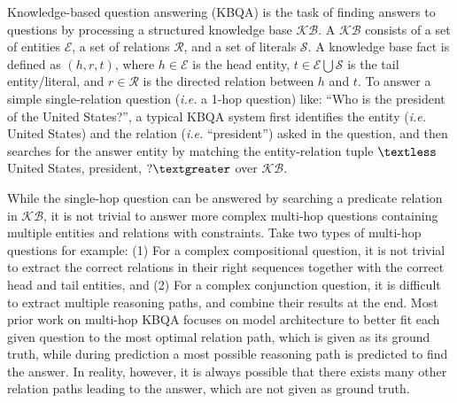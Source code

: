 Knowledge-based question answering (KBQA) is the task of finding answers to questions by processing a structured knowledge base $\mathcal{KB}$. %
A $\mathcal{KB}$ consists of a set of entities $\mathcal{E}$, a set of relations $\mathcal{R}$, and a set of literals $\mathcal{S}$. A knowledge base fact is defined as $(h,r,t)$, where $h\in \mathcal{E}$ is the head entity, $t \in \mathcal{E} \bigcup \mathcal{S}$ is the tail entity/literal, and $r\in \mathcal{R}$ is the directed relation between $h$ and $t$. To answer a simple single-relation question (\emph{i.e.} a 1-hop question) like: ``Who is the president of the United States?'', %
a typical KBQA system first identifies the entity (\emph{i.e.} United States) and the relation (\emph{i.e.} ``president'') asked in the question, and then searches for the answer entity by matching the entity-relation tuple $\textless$United States, president, $?\textgreater$ over $\mathcal{KB}$.


While the single-hop question can be answered by searching a predicate relation in $\mathcal{KB}$, it is not trivial to answer more complex multi-hop questions containing multiple entities and relations with constraints. Take two types of multi-hop questions for example: (1) For a complex compositional question, it is not trivial to extract the correct relations in their right sequences together with the correct head and tail entities, and (2) For a complex conjunction question, it is difficult to extract multiple reasoning paths, and combine their results at the end. Most prior work on multi-hop KBQA focuses on model architecture to better fit each given question to the most optimal relation path, which is given as its ground truth, while during prediction a most possible reasoning path is predicted to find the answer. In reality, however, it is always possible that there exists many other relation paths leading to the answer, which are not given as ground truth. %

